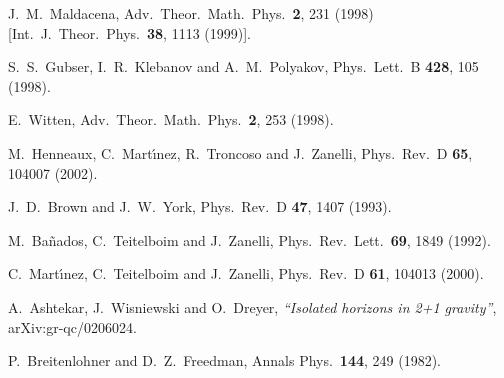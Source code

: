 \documentclass[a4paper,12pt]{article}
\begin{document}
\begin{thebibliography}{99}

  J.~M.~Maldacena, 
Adv.\ Theor.\ Math.\ Phys.\ \textbf{2}, 231 (1998) [Int.\ J.\ Theor.\ Phys.\ 
\textbf{38}, 1113 (1999)]. 


  S.~S.~Gubser, I.~R.~Klebanov and A.~M.~Polyakov, 
Phys.\ Lett.\ B \textbf{428}, 105 (1998). 


  E.~Witten, 
Adv.\ Theor.\ Math.\ Phys.\ \textbf{2}, 253 (1998). 


  M.~Henneaux, C.~Mart\'{\i }nez, R.~Troncoso and J.~Zanelli, 
Phys.\ Rev.\ D \textbf{65}, 104007 (2002). 


  J.~D.~Brown and J.~W.~York, 
Phys.\ Rev.\ D \textbf{47}, 1407 (1993). %


  M.~Ba{\~n}ados, C.~Teitelboim and J.~Zanelli, 
Phys.\ Rev.\ Lett.\ \textbf{69}, 1849 (1992). 


  C.~Mart\'{\i }nez, C.~Teitelboim and J.~Zanelli, 
Phys.\ Rev.\ D \textbf{61}, 104013 (2000). 



A.~Ashtekar, J.~Wisniewski and O.~Dreyer, 
{\it``Isolated horizons in 2+1 gravity''},
arXiv:gr-qc/0206024.



  P.~Breitenlohner and D.~Z.~Freedman, 
Annals Phys.\ \textbf{144}, 249 (1982). 


\end{thebibliography}
\end{document}
